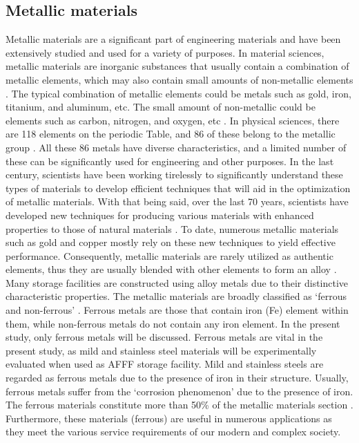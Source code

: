 \subsection{Metallic materials}
Metallic materials are a significant part of engineering materials and have been extensively studied and used for a variety of purposes.  In material sciences, metallic materials are inorganic substances that usually contain a combination of metallic elements, which may also contain small amounts of non-metallic elements \cite{rawlings2009materials}. The typical combination of metallic elements could be metals such as gold, iron, titanium, and aluminum, etc. The small amount of non-metallic could be elements such as carbon, nitrogen, and oxygen, etc \cite{hench2005biomaterials}. In physical sciences, there are 118 elements on the periodic Table, and 86 of these belong to the metallic group \cite{rawlings2009materials}. All these 86 metals have diverse characteristics, and a limited number of these can be significantly used for engineering and other purposes.  
In the last century, scientists have been working tirelessly to significantly understand these types of materials to develop efficient techniques that will aid in the optimization of metallic materials. With that being said, over the last 70 years, scientists have developed new techniques for producing various materials with enhanced properties to those of natural materials \cite{rawlings2009materials}. To date, numerous metallic materials such as gold and copper mostly rely on these new techniques to yield effective performance. Consequently, metallic materials are rarely utilized as authentic elements, thus they are usually blended with other elements to form an alloy \cite{hench2005biomaterials}. Many storage facilities are constructed using alloy metals due to their distinctive characteristic properties.
The metallic materials are broadly classified as ‘ferrous and non-ferrous’ \cite{rawlings2009materials}. Ferrous metals are those that contain iron (Fe) element within them, while non-ferrous metals do not contain any iron element. In the present study, only ferrous metals will be discussed. Ferrous metals are vital in the present study, as mild and stainless steel materials will be experimentally evaluated when used as AFFF storage facility.  Mild and stainless steels are regarded as ferrous metals due to the presence of iron in their structure. Usually, ferrous metals suffer from the ‘corrosion phenomenon’ due to the presence of iron. The ferrous materials constitute more than 50\% of the metallic materials section \cite{rawlings2009materials}. Furthermore, these materials (ferrous) are useful in numerous applications as they meet the various service requirements of our modern and complex society.
